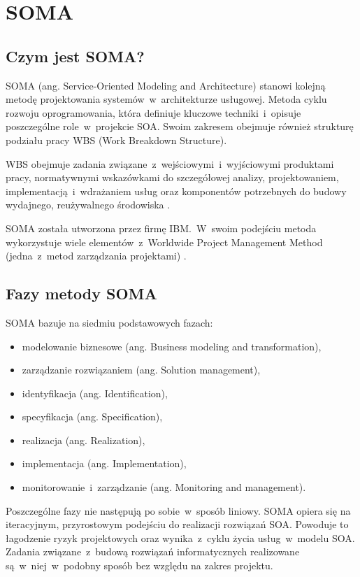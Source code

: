 \section{SOMA}
\subsection{Czym jest SOMA?}
SOMA (ang. Service-Oriented Modeling and Architecture) stanowi kolejną metodę projektowania systemów~w~architekturze usługowej. Metoda cyklu rozwoju oprogramowania, która definiuje kluczowe techniki~i~opisuje poszczególne role~w~projekcie SOA. Swoim zakresem obejmuje również strukturę podziału pracy WBS (Work Breakdown Structure). 

WBS obejmuje zadania związane~z~wejściowymi~i~wyjściowymi produktami pracy, normatywnymi wskazówkami do szczegółowej analizy, projektowaniem, implementacją~i~wdrażaniem usług oraz komponentów potrzebnych do budowy wydajnego, reużywalnego środowiska \cite{PlatIntGor}.

SOMA została utworzona przez firmę IBM.~W~swoim podejściu metoda wykorzystuje wiele elementów~z~Worldwide Project Management Method (jedna~z~metod zarządzania projektami) \cite{SOMAArsIBMJour}.

\subsection{Fazy metody SOMA}
SOMA bazuje na siedmiu podstawowych fazach:
\begin{itemize}
\item{modelowanie biznesowe (ang. Business modeling and transformation),}
\item{zarządzanie rozwiązaniem (ang. Solution management),}
\item{identyfikacja (ang. Identification),}
\item{specyfikacja (ang. Specification),}
\item{realizacja (ang. Realization),}
\item{implementacja (ang. Implementation),}
\item{monitorowanie~i~zarządzanie (ang. Monitoring and management).}
\end{itemize}

Poszczególne fazy nie następują po sobie~w~sposób liniowy. SOMA opiera się na iteracyjnym, przyrostowym podejściu do realizacji rozwiązań SOA. Powoduje to łagodzenie ryzyk projektowych oraz wynika~z~cyklu życia usług~w~modelu SOA. Zadania związane~z~budową rozwiązań informatycznych realizowane są~w~niej~w~podobny sposób bez względu na zakres projektu.

